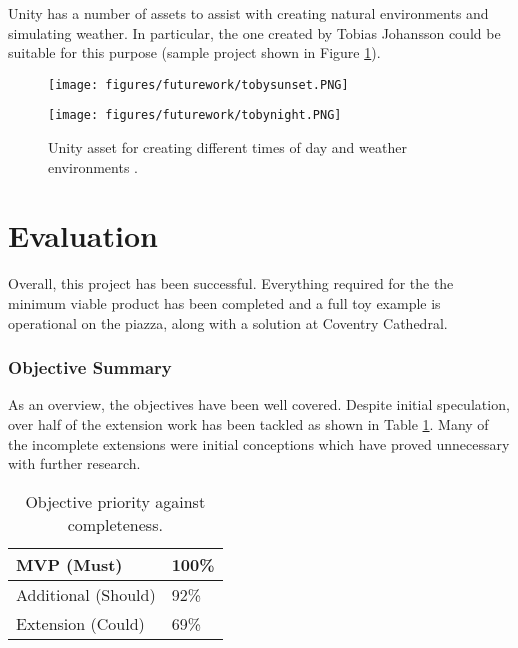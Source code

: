 \documentclass[12pt, a4paper]{article}
\begin{document}
Unity has a number of assets to assist with creating natural environments and simulating weather. In particular, the one created by Tobias Johansson could be suitable for this purpose \cite{futurework:weather} (sample project shown in Figure \ref{fig:weather}).

\begin{figure}[H]
\centering
\begin{minipage}{.44\textwidth}
  \centering
  \texttt{[image: figures/futurework/tobysunset.PNG]}
\end{minipage}%
\begin{minipage}{.42\textwidth}
  \centering
  \texttt{[image: figures/futurework/tobynight.PNG]}
\end{minipage}
\label{fig:weather}
\caption{Unity asset for creating different times of day 
and weather environments \cite{futurework:weather}.}
\end{figure}

\section{Evaluation}
\label{Evaluation}
Overall, this project has been successful. Everything required for the the minimum viable product has been completed and a full toy example is operational on the piazza, along with a solution at Coventry Cathedral. 

\subsubsection{Objective Summary}
As an overview, the objectives have been well covered. Despite initial speculation, over half of the extension work has been tackled as shown in Table \ref{table:objectivesummary}. Many of the incomplete extensions were initial conceptions which have proved unnecessary with further research.

\begin{table}[H]
\centering
\begin{tabular}{|l|l|}
\hline
MVP (Must)          & 100\% \\ \hline
Additional (Should) & 92\%  \\ \hline
Extension (Could)   & 69\%  \\ \hline
\end{tabular}
\caption{Objective priority against completeness.}
\label{table:objectivesummary}
\end{table}
\end{document}
